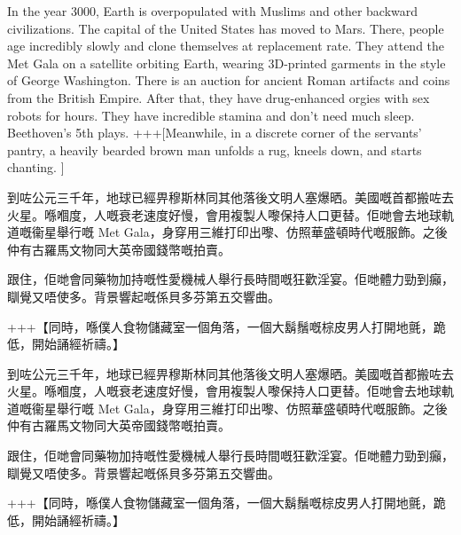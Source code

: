 In the year 3000, Earth is overpopulated with Muslims and other backward civilizations. The capital of the United States has moved to Mars. There, people age incredibly slowly and clone themselves at replacement rate. They attend the Met Gala on a satellite orbiting Earth, wearing 3D-printed garments in the style of George Washington. There is an auction for ancient Roman artifacts and coins from the British Empire. After that, they have drug-enhanced orgies with sex robots for hours. They have incredible stamina and don’t need much sleep. Beethoven’s 5th plays. +++[Meanwhile, in a discrete corner of the servants’ pantry, a heavily bearded brown man unfolds a rug, kneels down, and starts chanting. 
]

到咗公元三千年，地球已經畀穆斯林同其他落後文明人塞爆晒。美國嘅首都搬咗去火星。喺嗰度，人嘅衰老速度好慢，會用複製人嚟保持人口更替。佢哋會去地球軌道嘅衞星舉行嘅 Met Gala，身穿用三維打印出嚟、仿照華盛頓時代嘅服飾。之後仲有古羅馬文物同大英帝國錢幣嘅拍賣。

跟住，佢哋會同藥物加持嘅性愛機械人舉行長時間嘅狂歡淫宴。佢哋體力勁到癲，瞓覺又唔使多。背景響起嘅係貝多芬第五交響曲。

+++【同時，喺僕人食物儲藏室一個角落，一個大鬍鬚嘅棕皮男人打開地氈，跪低，開始誦經祈禱。】


到咗公元三千年，地球已經畀穆斯林同其他落後文明人塞爆晒。美國嘅首都搬咗去火星。喺嗰度，人嘅衰老速度好慢，會用複製人嚟保持人口更替。佢哋會去地球軌道嘅衞星舉行嘅 Met Gala，身穿用三維打印出嚟、仿照華盛頓時代嘅服飾。之後仲有古羅馬文物同大英帝國錢幣嘅拍賣。

跟住，佢哋會同藥物加持嘅性愛機械人舉行長時間嘅狂歡淫宴。佢哋體力勁到癲，瞓覺又唔使多。背景響起嘅係貝多芬第五交響曲。

+++【同時，喺僕人食物儲藏室一個角落，一個大鬍鬚嘅棕皮男人打開地氈，跪低，開始誦經祈禱。】